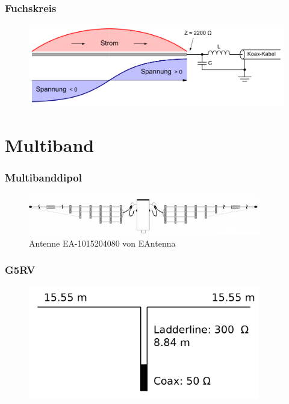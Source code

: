 \begin{frame}
  \frametitle{Fuchskreis}
  \begin{center}
    \begin{figure}
      \includegraphics[width=1\textwidth,height=.75\textheight,keepaspectratio]{a09/1000px-Endgespeiste_Antenne.png}
    \end{figure}
  \end{center}
\end{frame}

\section*{Multiband}

\begin{frame}
  \frametitle{Multibanddipol}
  \begin{center}
    \begin{figure}
      \includegraphics[width=0.9\textwidth,height=.75\textheight,keepaspectratio]{a09/Multiband.jpg}
      \caption{Antenne EA-1015204080 von EAntenna}
    \end{figure}
  \end{center}
\end{frame}

\begin{frame}
  \frametitle{G5RV}
  \begin{center}
    \begin{figure}
      \includegraphics[width=0.9\textwidth,height=.75\textheight,keepaspectratio]{a09/G5RV_Antenna.png}
    \end{figure}
  \end{center}
\end{frame}

